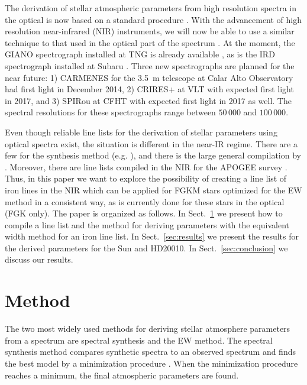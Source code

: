 \documentclass{aa}
\begin{document}
The derivation of stellar atmospheric parameters from high
resolution spectra in the optical is now based on a standard
procedure \citep[see e.g.][]{Valenti2005,Sousa2008a}. With the
advancement of high resolution near-infrared (NIR) instruments, we will now be able to use a similar
technique to that used in the optical part of the spectrum
\citep[see e.g.][]{Melendez1999,Sousa2008a,Tsantaki2013,Mucciarelli2013,Bensby2014}.
At the moment, the GIANO spectrograph installed at TNG is already
available \citep{GIANO}, as is the IRD spectrograph installed
at Subaru \citep{IRD}. Three new spectrographs are planned for the
near future: 1) CARMENES for the \SI{3.5}{m} telescope at Calar Alto
Observatory \citep{CARMENES} had first light in December 2014,
2) CRIRES+ at VLT \citep{CRIRESp} with expected first light in 2017,
and 3) SPIRou at CFHT \citep{SPIROU1,SPIROU2} with expected first light
in 2017 as well. The spectral resolutions for these spectrographs range
between $50\,000$ and $100\,000$.

Even though reliable line lists for the derivation of stellar parameters
using optical spectra exist, the situation is different in the near-IR
regime. There are a few for the synthesis method (e.g. \citet{Onehag2012,Origlia2013,Rhodin2015}),
 and there is  the large general compilation by
\citet{Melendez1999}. Moreover, there are line lists compiled
in the NIR for the APOGEE survey \citep[see e.g.][]{Smith2013,Shetrone2015}.
Thus, in this paper we want to explore the
possibility of creating a line list of iron lines in the NIR which can
be applied for FGKM stars optimized for the EW method in a consistent
way, as  is currently done for these stars in the optical (FGK
only). The paper is organized as follows. In Sect.~\ref{sec:method}
we present how to compile a line list and the method for deriving
parameters with the equivalent width method for an iron line list.
In Sect.~\ref{sec:results} we present the results for the derived
parameters for the Sun and HD20010. In
Sect.~\ref{sec:conclusion}  we discuss our results.


\section{Method}
\label{sec:method}

The two most widely used methods for deriving stellar atmosphere
parameters from a spectrum are spectral synthesis and the EW method.
The spectral synthesis method compares synthetic spectra to an observed
spectrum and finds the best model by a minimization procedure
\citep[see e.g.][]{Valenti2005,Onehag2012,Blanco2014}. When the minimization
procedure reaches a minimum, the final atmospheric parameters are found.
\end{document}

